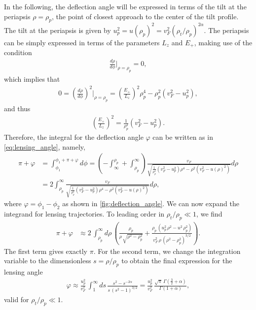 \documentclass[submission, Phys]{SciPost}
\begin{document}
\begin{appendix}
In the following, the deflection angle will be expressed in terms of the tilt at the periapsis $\rho=\rho_p$, the point of closest approach to the center of the tilt profile. The tilt at the periapsis is given by  $u_p^2=u(\rho_p)^2=v_F^2(\rho_t/\rho_p)^{2\alpha}$. The periapsis can be simply expressed in terms of the parameters $L_z$ and $E_+$, making use of the condition
\begin{align}
    \frac{d\rho}{d\phi}\bigg|_{\rho=\rho_p}=0,
\end{align}
which implies that 
\begin{align}
   0 = \left(\frac{d\rho}{d\phi}\right)^2\bigg|_{\rho=\rho_p} = \left(\frac{E_+}{L_z}\right)^2\rho_p^4-\rho_p^2(v_F^2-u_p^2),
\end{align}
and thus 
\begin{align}
    \left(\frac{E_+}{L_z}\right)^2 = \frac{1}{\rho_p^2}(v_F^2-u^2_p).
    \label{eq:periapsis}
\end{align}
Therefore, the integral for the deflection angle $\varphi$ can be written as in \cref{eq:lensing_angle}, namely,
\begin{align}
    \pi+\varphi &= \int ^{\phi_1+\pi+\varphi}_{\phi_1} d\phi = \left(-\int_\infty^{\rho_p}+\int_{\rho_p}^\infty\right)\frac{ v_F}{\sqrt{\frac{1}{\rho_p^2}(v_F^2-u_p^2)\rho^4-\rho^2(v_F^2-u(\rho)^2)}}d\rho \nonumber\\
    &= 2\int_{\rho_p}^\infty\frac{v_F}{\sqrt{\frac{1}{\rho_p^2}(v_F^2-u_p^2)\rho^4-\rho^2(v_F^2-u(\rho)^2)}}d\rho,
\end{align}
where $\varphi=\phi_1-\phi_2$ as shown in \cref{fig:deflection_angle}. We can now expand the integrand for lensing trajectories. To leading order in $\rho_t/\rho_p\ll1$, we find
\begin{align}
    \pi+\varphi &\approx 2\,\int_{\rho_p}^\infty d\rho\,\left(\frac{\rho_p}{\rho\,\sqrt{\rho^2-\rho_p^2}}+\frac{\rho_p\,\left(u_p^2\,\rho^2-u^2\,\rho_p^2\right)}{v_F^2\,\rho\,\left(\rho^2-\rho_p^2\right)^{3/2}}\right).
\end{align}
The first term gives exactly $\pi$. For the second term, we change the integration variable to the dimensionless $s = \rho/\rho_p$ to obtain the final expression for the lensing angle
\begin{align}
    \varphi\approx\frac{u_p^2}{v_F^2}\,\int_{1}^\infty ds\,{  \frac{s^2-s^{-2\alpha}}{s\,\left(s^2-1\right)^{3/2}}}=\frac{u_p^2}{v_F^2}\,\frac{\sqrt{\pi}\,\Gamma\left(\frac{3}{2}+\alpha\right)}{\Gamma\left(1+\alpha\right)},
\end{align}
valid for $\rho_t/\rho_p\ll1$.


\end{appendix}
\end{document}
